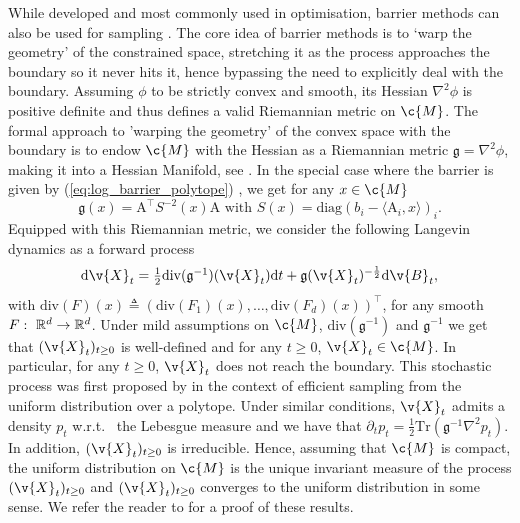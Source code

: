 While developed and most commonly used in optimisation, barrier methods can also be used for sampling \parencite{lee2017Geodesic}.
The core idea of barrier methods is to `warp the geometry' of the constrained space, stretching it as the process approaches the boundary so it never hits it, hence bypassing the need to explicitly deal with the boundary.
Assuming $\phi$ to be strictly convex and smooth, its Hessian $\nabla^2 \phi$ is positive definite and thus defines a valid Riemannian metric on $\c{M}$.
The formal approach to 'warping the geometry' of the convex space with the boundary is to endow $\c{M}$ with the Hessian as a Riemannian metric $\mathfrak{g} = \nabla^2 \phi$, making it into a Hessian Manifold, see \cite{shima1997geometry}.
In the special case where the barrier is given by (\ref{eq:log_barrier_polytope}) , we get for any $x \in \c{M}$ \begin{equation} \mathfrak{g}(x) = \mathrm{A}^\top S^{-2}(x) \mathrm{A} \text{ with } S(x) = \text{diag}(b_i - \langle \mathrm{A}_i, x \rangle)_i.
\end{equation}
Equipped with this Riemannian metric, we consider the following Langevin dynamics as a forward process \begin{equation} \label{eq:langevin_hessian_manifold} \textstyle{ \mathrm{d} \v{X}_t = \tfrac{1}{2} \mathrm{div}(\mathfrak{g}^{-1})( \v{X}_t) \mathrm{d} t + \mathfrak{g}( \v{X}_t)^{-\frac{1}{2}} \mathrm{d} \v{B}_t, } \end{equation} with $\mathrm{div}(F)(x) \triangleq \left(\mathrm{div}(F_1)(x), \dots, \mathrm{div}(F_d)(x) \right)^\top $, for any smooth $F: \ \mathbb{R}^d \to \mathbb{R}^d$.
Under mild assumptions on $\c{M}$, $\mathrm{div}(\mathfrak{g}^{-1})$ and $\mathfrak{g}^{-1}$ we get that $( \v{X}_t)_{t \geq 0}$ is well-defined and for any $t \geq 0$, $ \v{X}_t \in \c{M}$.
In particular, for any $t \geq 0$, $ \v{X}_t$ does not reach the boundary.
This stochastic process was first proposed by \cite{lee2017Geodesic} in the context of efficient sampling from the uniform distribution over a polytope.
Under similar conditions, $ \v{X}_t$ admits a density $p_t$ w.r.t.
\ the Lebesgue measure and we have that $\partial_t p_t = \tfrac{1}{2} \mathrm{Tr}(\mathfrak{g}^{-1} \nabla^2p_t)$.
In addition, $( \v{X}_t)_{t \geq 0}$ is irreducible.
Hence, assuming that $\c{M}$ is compact, the uniform distribution on $\c{M}$ is the unique invariant measure of the process $( \v{X}_t)_{t \geq 0}$ and $( \v{X}_t)_{t \geq 0}$ converges to the uniform distribution in some sense.
We refer the reader to  for a proof of these results.

